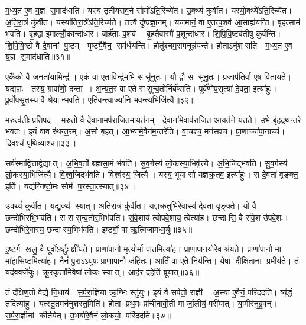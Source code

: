 म॒ध्य॒त ए॒व य॒ज्ञ स॒माद॑धाति।
यस्य॑ तृतीयसव॒ने सोमो॑ऽति॒रिच्ये॑त।
उ॒क्थ्यं॑ कुर्वीत।
यस्यो॒क्थ्ये॑ऽति॒रिच्ये॑त।
अ॒ति॒रा॒त्रं कु॑र्वीत।
यस्या॑तिरा॒त्रे॑ऽति॒रिच्य॑ते।
तत्त्वै दु॑ष्प्रज्ञा॒नम्।
यज॑मानं॒ वा ए॒तत्प॒शव॑ आ॒साह्य॑यन्ति।
बृ॒हत्साम॑ भवति।
बृ॒हद्वा इ॒माल्लोँ॒कान्दा॑धार।
बार्\mbox{}ह॑ताः प॒शव॑।
बृ॒ह॒तैवास्मै॑ प॒शून्दा॑धार।
शि॒पि॒वि॒ष्टव॑तीषु कुर्वन्ति।
शि॒पि॒वि॒ष्टो वै दे॒वानां पु॒ष्टम्।
पुष्ट्यै॒वैन॒ सम॑र्धयन्ति।
होतु॑श्चम॒समनून्न॑यन्ते।
होताऽनु॑शसति।
म॒ध्य॒त ए॒व य॒ज्ञ स॒माद॑धाति॥३१॥\anuvakamend[य॒न्ति॒ सव॑नस्याति॒रिच्य॑ते शसति दाधारा॒ष्टौ च॑]

एकै॑को॒ वै ज॒नता॑या॒मिन्द्र॑।
एकं॒ वा ए॒ताविन्द्र॑म॒भि ससु॑नुतः।
यौ द्वौ स सुनु॒तः।
प्र॒जाप॑ति॒र्वा ए॒ष विता॑यते।
यद्य॒ज्ञः।
तस्य॒ ग्रावा॑णो॒ दन्ता।
अ॒न्य॒त॒रं वा ए॒ते ससुन्व॒तोर्निर्ब॑प्सति।
पूर्वे॑णोप॒सृत्या॑ दे॒वता॒ इत्या॑हुः।
पू॒र्वो॒प॒सृ॒तस्य॒ वै श्रेयान्भवति।
एति॑व॒न्त्याज्या॑नि भवन्त्य॒भिजि॑त्यै॥३२॥

म॒रुत्व॑तीः प्रति॒पद॑।
म॒रुतो॒ वै दे॒वाना॒मप॑राजितमा॒यत॑नम्।
दे॒वाना॑मे॒वाप॑राजित आ॒यत॑ने यतते।
उ॒भे बृ॑हद्रथन्त॒रे भ॑वतः।
इ॒यं वाव र॑थन्त॒रम्।
अ॒सौ बृ॒हत्।
आ॒भ्यामे॒वैन॑म॒न्तरे॑ति।
वा॒चश्च॒ मन॑सश्च।
प्रा॒णाच्चा॑पा॒नाच्च॑।
दि॒वश्च॑ पृथि॒व्याश्च॑॥३३॥

सर्व॑स्माद्वि॒त्ताद्वेद्यात्।
अ॒भि॒व॒र्तो ब्र॑ह्मसा॒मं भ॑वति।
सु॒व॒र्गस्य॑ लो॒कस्या॒भिवृ॑त्त्यै।
अ॒भि॒जिद्भ॑वति।
सु॒व॒र्गस्य॑ लो॒कस्या॒भिजि॑त्यै।
वि॒श्व॒जिद्भ॑वति।
विश्व॑स्य॒ जित्यै।
यस्य॒ भूयासो यज्ञक्र॒तव॒ इत्या॑हुः।
स दे॒वता॑ वृङ्क्त॒ इति॑।
यद्य॑ग्निष्टो॒मः सोम॑ प॒रस्ता॒त्स्यात्॥३४॥

उ॒क्थ्यं॑ कुर्वीत।
यद्यु॒क्थ॑ स्यात्।
अ॒ति॒रा॒त्रं कु॑र्वीत।
य॒ज्ञ॒क्र॒तुभि॑रे॒वास्य॑ दे॒वता॑ वृङ्क्ते।
यो वै छन्दो॑भिरभि॒भव॑ति।
स ससुन्व॒तोर॒भिभ॑वति।
सं॒वे॒शाय॑ त्वोपवे॒शाय॒ त्वेत्या॑ह।
छन्दासि॒ वै सं॑वे॒श उ॑पवे॒शः।
छन्दो॑भिरे॒वास्य॒ छन्दास्य॒भिभ॑वति।
इ॒ष्टर्गो॒ वा ऋ॒त्विजा॑मध्व॒र्युः॥३५॥

इ॒ष्टर्ग॒ खलु॒ वै पूर्वो॒ऽर्ष्टुः क्षी॑यते।
प्राणा॑पानौ मृ॒त्योर्मा॑ पात॒मित्या॑ह।
प्रा॒णा॒पा॒नयो॑रे॒व श्र॑यते।
प्राणा॑पानौ॒ मा मा॑हासिष्ट॒मित्या॑ह।
नैनं॑ पु॒राऽऽयु॑षः प्राणापा॒नौ ज॑हितः।
आर्तिं॒ वा ए॒ते निय॑न्ति।
येषां दीक्षि॒तानां प्र॒मीय॑ते।
तं यद॑व॒वर्जे॑युः।
क्रू॒र॒कृता॑मिवैषां लो॒कः स्यात्।
आह॑र द॒हेति॑ ब्रूयात्॥३६॥

तं द॑क्षिण॒तो वेद्यै॑ नि॒धाय॑।
स॒र्प॒रा॒ज्ञिया॑ ऋ॒ग्भिः स्तु॑युः।
इ॒यं वै सर्प॑तो॒ राज्ञी।
अ॒स्या ए॒वैनं॒ परि॑ददति।
व्यृ॑द्धं॒ तदित्या॑हुः।
यत्स्तु॒तमन॑नुशस्त॒मिति॑।
होता प्रथ॒मः प्रा॑चीनावी॒ती मार्जा॒लीयं॒ परी॑यात्।
या॒मीर॑नुब्रु॒वन्।
स॒र्प॒रा॒ज्ञीनां कीर्तयेत्।
उ॒भयो॑रे॒वैनं॑ लो॒कयो॒ परि॑ददति॥३७॥

